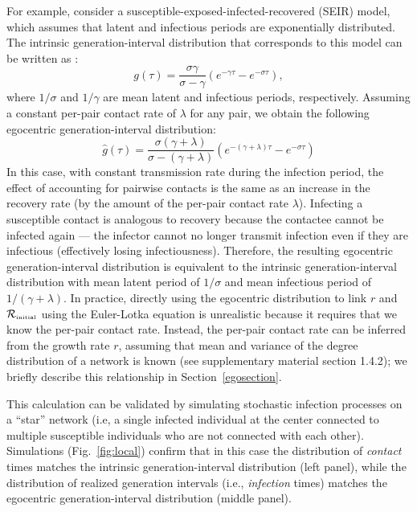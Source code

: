 \documentclass[12pt]{article}
\newcommand{\fref}[1]{Fig.~\ref{fig:#1}}
\newcommand{\Rx}[1]{\ensuremath{{\mathcal R}_{#1}}\xspace}
\newcommand{\Rini}{\Rx{\textrm{\tiny initial}}}
\begin{document}
For example, consider a susceptible-exposed-infected-recovered (SEIR) model, which assumes that latent and infectious periods are exponentially distributed.
The intrinsic generation-interval distribution that corresponds to this model can be written as \citep{Champredon2018equivalence}:
\begin{equation}
g(\tau) = \frac{\sigma \gamma}{\sigma - \gamma} \left(e^{-\gamma \tau} - e^{-\sigma \tau}\right),
\end{equation}
where $1/\sigma$ and $1/\gamma$ are mean latent and infectious periods, respectively.
Assuming a constant per-pair contact rate of $\lambda$ for any pair, we obtain the following egocentric generation-interval distribution:
\begin{equation}
\hat{g}(\tau) = \frac{\sigma (\gamma + \lambda)}{\sigma - (\gamma + \lambda)} \left(e^{-(\gamma + \lambda)\tau} - e^{-\sigma \tau}\right)
\end{equation}
In this case, with constant transmission rate during the infection period, the effect of accounting for pairwise contacts is the same as an increase in the recovery rate (by the amount of the per-pair contact rate $\lambda$). 
Infecting a susceptible contact is analogous to recovery because the contactee cannot be infected again --- the infector cannot no longer transmit infection even if they are infectious (effectively losing infectiousness).
Therefore, the resulting egocentric generation-interval distribution is equivalent to the intrinsic generation-interval distribution with mean latent period of $1/\sigma$ and mean infectious period of $1/(\gamma + \lambda)$.
In practice, directly using the egocentric distribution to link $r$ and $\Rini$ using the Euler-Lotka equation is unrealistic because it requires that we know the per-pair contact rate. 
Instead, the per-pair contact rate can be inferred from the growth rate $r$, assuming that mean and variance of the degree distribution of a network is known (see \cite{trapman2016inferring} supplementary material section 1.4.2);
we briefly describe this relationship in Section~\ref{egosection}.

This calculation can be validated by simulating stochastic infection processes on a ``star'' network (i.e, a single infected individual at the center connected to multiple susceptible individuals who are not connected with each other).
Simulations (\fref{local}) confirm that in this case the distribution of \emph{contact} times matches the intrinsic generation-interval distribution (left panel), while the distribution of realized generation intervals (i.e., \emph{infection} times) matches the egocentric generation-interval distribution (middle panel).
\end{document}
